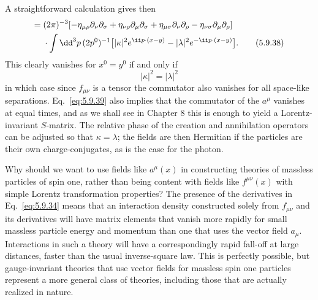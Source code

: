 A straightforward calculation gives then
\begin{align}
[f_{\mu\nu}(x),f_{\rho\sigma}(y)^\dagger]
={}&(2\pi)^{-3}
[-\eta_{\mu\rho}\partial_\nu\partial_\sigma
+\eta_{\nu\rho}\partial_\mu\partial_\sigma
+\eta_{\mu\sigma}\partial_\nu\partial_\rho
-\eta_{\nu\sigma}\partial_\mu\partial_\rho]
\notag\\
&\cdot\int \dd^3p\,(2p^0)^{-1}
\bigl[|\kappa|^2e^{\ii p\cdot(x-y)}-|\lambda|^2e^{-\ii p\cdot(x-y)}\bigr].
\tag{5.9.38}\label{eq:5.9.38}
\end{align}
This clearly vanishes for $x^0=y^0$ if and only if
\begin{equation}
|\kappa|^2=|\lambda|^2
\tag{5.9.39}\label{eq:5.9.39}
\end{equation}
in which case since $f_{\mu\nu}$ is a tensor the commutator also vanishes for
all space-like separations. Eq.~\eqref{eq:5.9.39} also implies that the commutator of
the $a^\mu$ vanishes at equal times, and as we shall see in Chapter 8 this is
enough to yield a Lorentz-invariant $S$-matrix. The relative phase of the
creation and annihilation operators can be adjusted so that $\kappa=\lambda$;
the fields are then Hermitian if the particles are their own
charge-conjugates, as is the case for the photon.

Why should we want to use fields like $a^\mu(x)$ in constructing theories of
massless particles of spin one, rather than being content with fields like
$f^{\mu\nu}(x)$ with simple Lorentz transformation properties? The presence of
the derivatives in Eq.~\eqref{eq:5.9.34} means that an interaction density constructed
solely from $f_{\mu\nu}$ and its derivatives will have matrix elements that
vanish more rapidly for small massless particle energy and momentum than one
that uses the vector field $a_\mu$. Interactions in such a theory will have a
correspondingly rapid fall-off at large distances, faster than the usual
inverse-square law. This is perfectly possible, but gauge-invariant theories
that use vector fields for massless spin one particles represent a more
general class of theories, including those that are actually realized in
nature.

